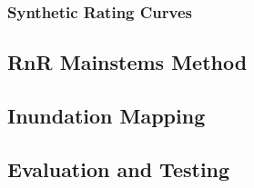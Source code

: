 \subsubsection{Synthetic Rating Curves}
%

%
\subsection{RnR Mainstems Method}
%

%
\subsection{Inundation Mapping}
%

%
\subsection{Evaluation and Testing}
%

%
